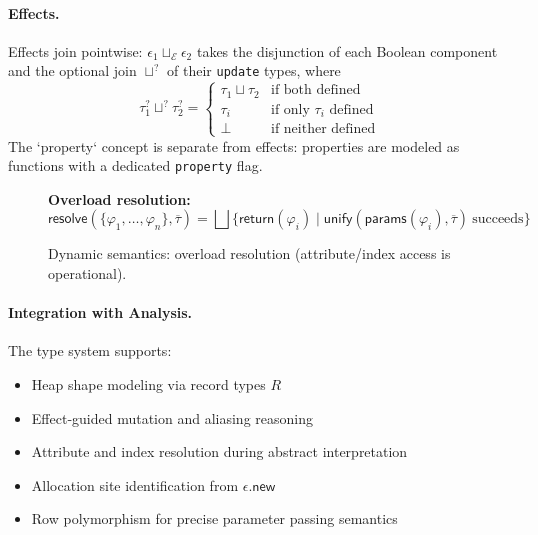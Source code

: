 \paragraph{Effects.}  
Effects join pointwise: $\epsilon_1 \sqcup_{\mathcal{E}} \epsilon_2$ 
takes the disjunction of each Boolean component and the optional join $\sqcup^?$ of their \texttt{update} types, where
\[
\tau_1^? \sqcup^? \tau_2^? =
\begin{cases}
\tau_1 \sqcup \tau_2 & \text{if both defined} \\
\tau_i & \text{if only } \tau_i \text{ defined} \\
\bot & \text{if neither defined}
\end{cases}
\]
The `property` concept is separate from effects: properties are modeled as functions with a dedicated \texttt{property} flag.

\begin{figure*}[t]
\centering
\textbf{Overload resolution:}
\[
\mathsf{resolve}(\{\varphi_1, \ldots, \varphi_n\}, \overline{\tau}) =
\bigsqcup\{\mathsf{return}(\varphi_i) \mid \mathsf{unify}(\mathsf{params}(\varphi_i), \overline{\tau}) \ \text{succeeds}\}
\]
\caption{Dynamic semantics: overload resolution (attribute/index access is operational).}
\label{fig:dynamic}
\end{figure*}

\paragraph{Integration with Analysis.}  
The type system supports:
\begin{itemize}
\item Heap shape modeling via record types $R$
\item Effect‐guided mutation and aliasing reasoning
\item Attribute and index resolution during abstract interpretation
\item Allocation site identification from $\epsilon.\mathsf{new}$
\item Row polymorphism for precise parameter passing semantics
\end{itemize}
